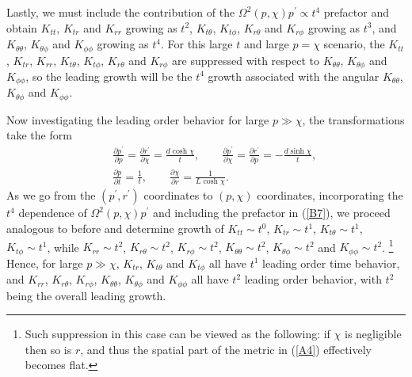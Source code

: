 Lastly, we must include the contribution of the $\Omega^2(p,\chi)p^{\prime}\propto t^4$ prefactor and obtain $K_{tt}$, $K_{tr}$ and $K_{rr}$  growing as $t^2$, $K_{t\theta}$, $K_{t\phi}$, $K_{r\theta}$ and $K_{r\phi}$ growing as $t^3$, and $K_{\theta\theta}$, $K_{\theta\phi}$ and $K_{\phi\phi}$ growing as $t^4$. For this large $t$ and large $p=\chi$ scenario, the $K_{tt}$, $K_{tr}$, $K_{rr}$, $K_{t\theta}$, $K_{t\phi}$, $K_{r\theta}$ and $K_{r\phi}$ are suppressed with respect to $K_{\theta\theta}$, $K_{\theta\phi}$ and $K_{\phi\phi}$, so the leading growth will be the $t^4$ growth associated with the angular $K_{\theta\theta}$, $K_{\theta\phi}$ and $K_{\phi\phi}$. 


Now investigating the leading order behavior for large $p\gg \chi$, the transformations take the form
%
\begin{eqnarray}
&&\frac{\partial p^{\prime }}{\partial p}=\frac{\partial r^{\prime }}{\partial \chi}=\frac{d\cosh\chi}{t},\qquad
\frac{\partial p^{\prime }}{\partial \chi}=\frac{\partial r^{\prime }}{\partial p}=-\frac{d\sinh\chi}{t}, 
\nonumber\\
&& \frac{\partial p}{\partial t}=\frac{1}{t},\qquad \frac{\partial \chi}{\partial r}=\frac{1}{L\cosh\chi}.
\label{B11}
\end{eqnarray}
%
As we go from the  $(p^{\prime},r^{\prime})$ coordinates to $(p,\chi)$ coordinates, incorporating the $t^4$ dependence of $\Omega^2(p,\chi)p^{\prime}$ and including the prefactor in (\ref{B7}), we proceed analogous to before and determine growth of $K_{tt}\sim t^0$, $K_{tr}\sim t^1$, $K_{t\theta}\sim t^1$, $K_{t\phi}\sim t^1$, while $K_{rr}\sim t^2$, $K_{r\theta}\sim t^2$, $K_{r\phi}\sim t^2$,  $K_{\theta\theta}\sim t^2$, $K_{\theta\phi}\sim t^2$ and $K_{\phi\phi}\sim t^2$.
\footnote{Such suppression in this case can be viewed as the following: if $\chi$ is negligible then so is $r$, and thus the spatial part of the metric in (\ref{A4}) effectively becomes flat.}
Hence, for large $p \gg \chi$,  $K_{tr}$, $K_{t\theta}$ and $K_{t\phi}$ all have $t^1$ leading order time behavior, and $K_{rr}$, $K_{r\theta}$, $K_{r\phi}$,  $K_{\theta\theta}$, $K_{\theta\phi}$ and $K_{\phi\phi}$  all have $t^2$ leading order behavior, with $t^2$ being the overall leading growth.



